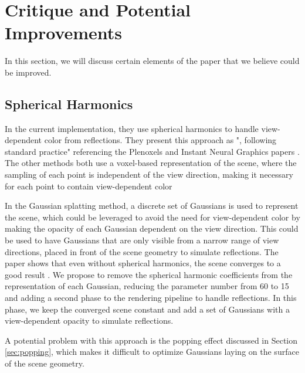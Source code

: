 \section{Critique and Potential Improvements}
In this section, we will discuss certain elements of the paper that we believe could be improved.

\subsection{Spherical Harmonics}
In the current implementation, they use spherical harmonics to handle view-dependent color from reflections.
They present this approach as ", following standard practice" referencing the Plenoxels and Instant Neural Graphics papers \cite{yuPlenoxelsRadianceFields2021a}\cite{mullerInstantNeuralGraphics2022}.
The other methods both use a voxel-based representation of the scene,
where the sampling of each point is independent of the view direction,
making it necessary for each point to contain view-dependent color \cite{yuPlenoxelsRadianceFields2021a}\cite{mullerInstantNeuralGraphics2022}

In the Gaussian splatting method, a discrete set of Gaussians is used to represent the scene, which could be leveraged to avoid the need for view-dependent color by making the opacity of each Gaussian dependent on the view direction.
This could be used to have Gaussians that are only visible from a narrow range of view directions, placed in front of the scene geometry to simulate reflections.
The paper shows that even without spherical harmonics, the scene converges to a good result \cite[Table 3]{kerbl3DGaussianSplatting2023}.
We propose to remove the spherical harmonic coefficients from the representation of each Gaussian, reducing the parameter number from 60 to 15 and adding a second phase to the rendering pipeline to handle reflections.
In this phase, we keep the converged scene constant and add a set of Gaussians with a view-dependent opacity to simulate reflections.

A potential problem with this approach is the popping effect discussed in Section \ref{sec:popping}, which makes it difficult to optimize Gaussians laying on the surface of the scene geometry.
